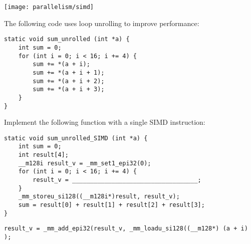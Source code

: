 \begin{blocksection}

\texttt{[image: parallelism/simd]}

\question
The following code uses loop unrolling to improve performance:
\begin{verbatim}
static void sum_unrolled (int *a) {
    int sum = 0;
    for (int i = 0; i < 16; i += 4) {
        sum += *(a + i);
        sum += *(a + i + 1);
        sum += *(a + i + 2);
        sum += *(a + i + 3);
    }
}
\end{verbatim}

Implement the following function with a single SIMD instruction:
\begin{verbatim}
static void sum_unrolled_SIMD (int *a) {
    int sum = 0;
    int result[4];
    __m128i result_v = _mm_set1_epi32(0);
    for (int i = 0; i < 16; i += 4) {
        result_v = ___________________________________;
    }
    _mm_storeu_si128((__m128i*)result, result_v);
    sum = result[0] + result[1] + result[2] + result[3];
}
\end{verbatim}

\begin{solution}[0.5in]
\begin{verbatim}
result_v = _mm_add_epi32(result_v, _mm_loadu_si128((__m128*) (a + i) );
\end{verbatim}
\end{solution}
    
\end{blocksection}